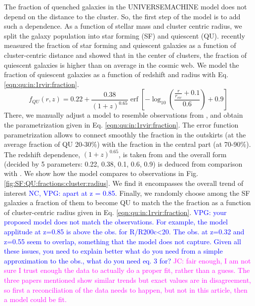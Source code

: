 \documentclass[fleqn,usenatbib,onecolumn]{mnras}
\DeclareMathOperator\erf{erf}
\begin{document}
The fraction of quenched galaxies in the \textsc{UNIVERSEMACHINE} model does not depend on the distance to the cluster. So, the first step of the model is to add such a dependence. As a function of stellar mass and cluster centric radius, we split the galaxy population into star forming (SF) and quiescent (QU). 
\citet{2017MNRAS.467.4015H,2018PASJ...70S..24N,Murata2020arXiv200101160M} recently measured the fraction of star forming and quiescent galaxies as a function of cluster-centric distance and showed that in the center of clusters, the fraction of quiescent galaxies is higher than on average in the cosmic web. 
We model the fraction of quiescent galaxies as a function of redshift and radius with Eq. \ref{eqn:qu:in:1rvir:fraction}. 
\begin{equation}
\label{eqn:qu:in:1rvir:fraction}
f_{QU}(r,z) = 0.22 + \frac{0.38}{ (1+z)^{0.65} } \erf\left[-\log_{10}\left(\frac{\frac{r}{r_{vir}}+0.1}{0.6}\right)+0.9 \right] 
\end{equation}
There, we manually adjust a model to resemble observations from \citet{2017MNRAS.467.4015H,2018PASJ...70S..24N,Murata2020arXiv200101160M}, 
and obtain the parametrization given in Eq. \ref{eqn:qu:in:1rvir:fraction}. 
The error function parametrization allows to connect smoothly the fraction in the outskirts (at the average fraction of QU 20-30\%) with the fraction in the central part (at 70-90\%). 
The redshift dependence, $(1+z)^{0.65}$, is taken from \citet{2017MNRAS.467.4015H} and the overall form (decided by 5 parameters: 0.22, 0.38, 0.1, 0.6, 0.9) is deduced from comparison with \citep{2018PASJ...70S..24N}. 
We show how the model compares to \citep{2018PASJ...70S..24N} observations in Fig. \ref{fig:SF:QU:fractions:cluster:radius}. 
We find it encompasses the overall trend of interest \textcolor{blue}{NC, VPG: apart at z = 0.85}. 
Finally, we randomly choose among the SF galaxies a fraction of them to become QU to match the the fraction as a function of cluster-centric radius given in Eq. \ref{eqn:qu:in:1rvir:fraction}. 
\textcolor{blue}{VPG: your proposed model does not match the observations. For example, the model applitude at z=0.85 is above the obs. for R/R200c<20. The obs. at z=0.32 and z=0.55 seem to overlap, something that the model does not capture. Given all these issues, you need to explain better what do you need from a simple approximation to the obs., what do you need eq. 3 for?}
\textcolor{magenta}{JC: fair enough, I am not sure I trust enough the data to actually do a proper fit, rather than a guess. The three papers mentioned show similar trends but exact values are in disagreement, so first a reconciliation of the data needs to happen, but not in this article, then a model could be fit.}
\end{document}
